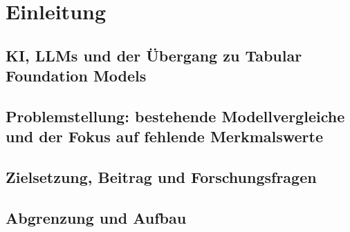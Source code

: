 \section{Einleitung}\label{sec:einleitung}

\subsection{KI, LLMs und der Übergang zu Tabular Foundation Models}\label{sec:einleitung-kontext}

\subsection{Problemstellung: bestehende Modellvergleiche und der Fokus auf fehlende Merkmalswerte}\label{sec:einleitung-problem}

\subsection{Zielsetzung, Beitrag und Forschungsfragen}\label{sec:einleitung-ziel}

\subsection{Abgrenzung und Aufbau}\label{sec:einleitung-aufbau}
